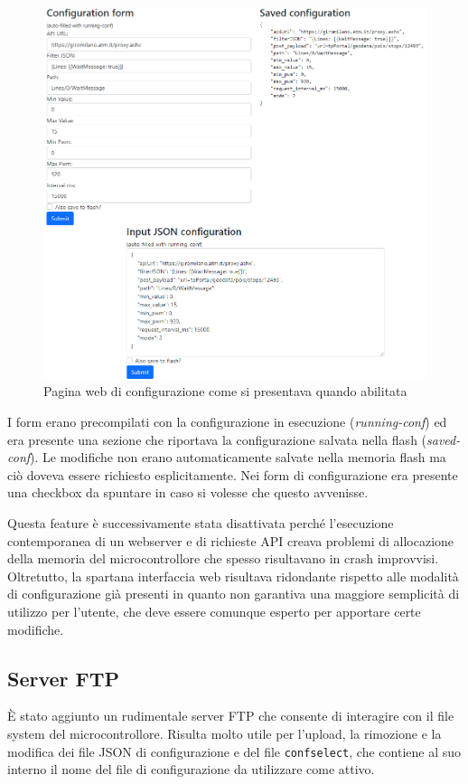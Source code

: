 \documentclass[12pt,a4paper]{report}
\begin{document}
\begin{figure}[h]
  \centering
  \includegraphics[width=\textwidth]{confwebpage}
  \caption{Pagina web di configurazione come si presentava quando abilitata}
  \label{fig:confwebpage}
\end{figure}

I form erano precompilati con la configurazione in esecuzione (\emph{running-conf}) ed era presente una sezione che riportava la
configurazione salvata nella flash (\emph{saved-conf}).
Le modifiche non erano automaticamente salvate nella memoria flash ma ciò doveva essere richiesto esplicitamente. Nei form di configurazione
era presente una checkbox da spuntare in caso si volesse che questo avvenisse.

Questa feature è successivamente stata disattivata perché l'esecuzione contemporanea di un webserver e di richieste API creava
problemi di allocazione della memoria del microcontrollore che spesso risultavano in crash improvvisi. Oltretutto, la spartana
interfaccia web risultava ridondante rispetto alle modalità di configurazione già presenti in quanto non garantiva una maggiore
semplicità di utilizzo per l'utente, che deve essere comunque esperto per apportare certe modifiche.

\subsection{Server FTP}
È stato aggiunto un rudimentale server FTP che consente di interagire con il file system del microcontrollore. Risulta molto utile per
l'upload, la rimozione e la modifica dei file JSON di configurazione e del file \texttt{confselect}, che contiene al suo interno il nome
del file di configurazione da utilizzare come attivo.
\end{document}
